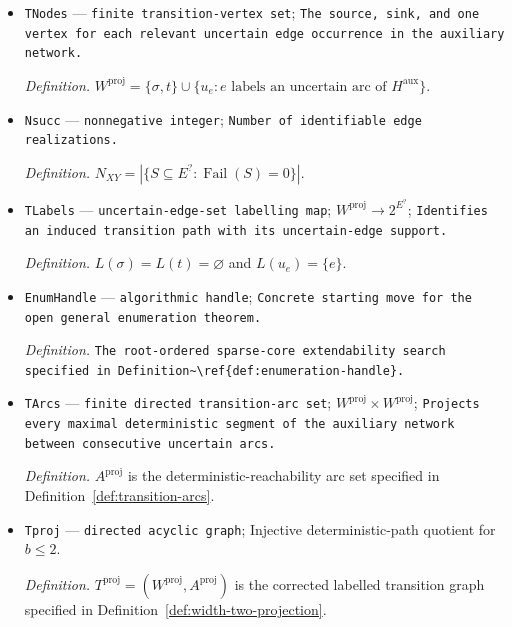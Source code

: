 \documentclass{article}
\begin{document}
\begin{itemize}
  \par\smallskip\noindent\emph{Definition.} \(\mathcal D\) is the deterministic-diamond instance specified in Definition~\ref{def:deterministic-diamond-instance}.
  \item \texttt{TNodes} --- \texttt{finite transition-\allowbreak{}vertex set}; \texttt{The source,\allowbreak{} sink,\allowbreak{} and one vertex for each relevant uncertain edge occurrence in the auxiliary network.}
  \par\smallskip\noindent\emph{Definition.} \(W^{\mathrm{proj}}=\{\sigma,t\}\cup\{u_e:e\text{ labels an uncertain arc of }H^{\mathrm{aux}}\}\).
  \item \texttt{Nsucc} --- \texttt{nonnegative integer}; \texttt{Number of identifiable edge realizations.}
  \par\smallskip\noindent\emph{Definition.} \(N_{XY}=|\{S\subseteq E^{?}:\operatorname{Fail}(S)=0\}|\).
  \item \texttt{TLabels} --- \texttt{uncertain-\allowbreak{}edge-\allowbreak{}set labelling map}; \(W^{\mathrm{proj}}\to2^{E^{?}}\); \texttt{Identifies an induced transition path with its uncertain-\allowbreak{}edge support.}
  \par\smallskip\noindent\emph{Definition.} \(L(\sigma)=L(t)=\varnothing\) and \(L(u_e)=\{e\}\).
  \item \texttt{EnumHandle} --- \texttt{algorithmic handle}; \texttt{Concrete starting move for the open general enumeration theorem.}
  \par\smallskip\noindent\emph{Definition.} \texttt{The root-\allowbreak{}ordered sparse-\allowbreak{}core extendability search specified in Definition\textasciitilde{}\textbackslash{}\allowbreak{}ref\{def:\allowbreak{}enumeration-\allowbreak{}handle\}\allowbreak{}.}
  \item \texttt{TArcs} --- \texttt{finite directed transition-\allowbreak{}arc set}; \(W^{\mathrm{proj}}\times W^{\mathrm{proj}}\); \texttt{Projects every maximal deterministic segment of the auxiliary network between consecutive uncertain arcs.}
  \par\smallskip\noindent\emph{Definition.} \(A^{\mathrm{proj}}\) is the deterministic-reachability arc set specified in Definition~\ref{def:transition-arcs}.
  \item \texttt{Tproj} --- \texttt{directed acyclic graph}; Injective deterministic-path quotient for \(b\le2\).
  \par\smallskip\noindent\emph{Definition.} \(T^{\mathrm{proj}}=(W^{\mathrm{proj}},A^{\mathrm{proj}})\) is the corrected labelled transition graph specified in Definition~\ref{def:width-two-projection}.
\end{itemize}
\end{document}
